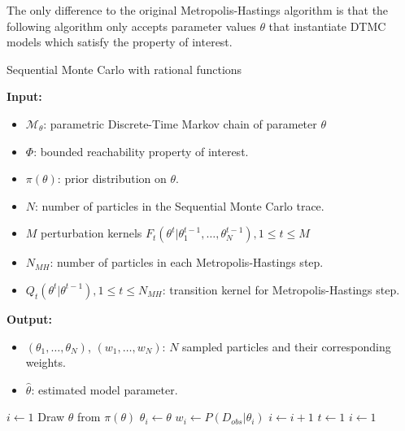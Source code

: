 The only difference to the original Metropolis-Hastings algorithm is that the following algorithm
only accepts parameter values $\theta$ that instantiate DTMC models which satisfy the property of
interest.
\begin{algorithm}[H]
    \caption{Sequential Monte Carlo with rational functions}
    \label{alg:rf-smc}
    \footnotesize{
        \hspace*{\algorithmicindent} \textbf{Input:}
        \begin{itemize}[noitemsep,topsep=0pt]
            \item $\mathcal{M}_\theta$: parametric Discrete-Time Markov chain of parameter $\theta$
            \item $\Phi$: bounded reachability property of interest.
            \item $\pi(\theta)$: prior distribution on $\theta$.
            \item $N$: number of particles in the Sequential Monte Carlo trace.
            \item $M$ perturbation kernels $F_t(\theta^t | \theta^{t-1}_1,\ldots,\theta^{t-1}_N),
                      1\leq t \leq M$
            \item $N_{MH}$: number of particles in each Metropolis-Hastings step.
            \item $Q_t(\theta^t|\theta^{t-1}), 1 \leq t \leq N_{MH}$: transition kernel for
                  Metropolis-Hastings step.
        \end{itemize}
        \hspace*{\algorithmicindent} \textbf{Output:}
        \begin{itemize}[noitemsep,topsep=0pt]
            \item $(\theta_1,\ldots,\theta_N)$, $(w_1,\ldots,w_N)$: $N$ sampled particles and their
                  corresponding weights.
            \item $\hat{\theta}$: estimated model parameter.
        \end{itemize}
    }
    \begin{algorithmic}[1]
        \State $i \leftarrow 1$
         
        \State Draw $\theta$ from $\pi(\theta)$
        \State $\theta_i \leftarrow \theta$
        \State $w_i \leftarrow P(D_{obs}|\theta_i)$
        \State $i \leftarrow i + 1$
        \EndWhile
        \State $t \leftarrow 1$
        \State $i \leftarrow 1$ 

\end{algorithmic}
\end{algorithm}
